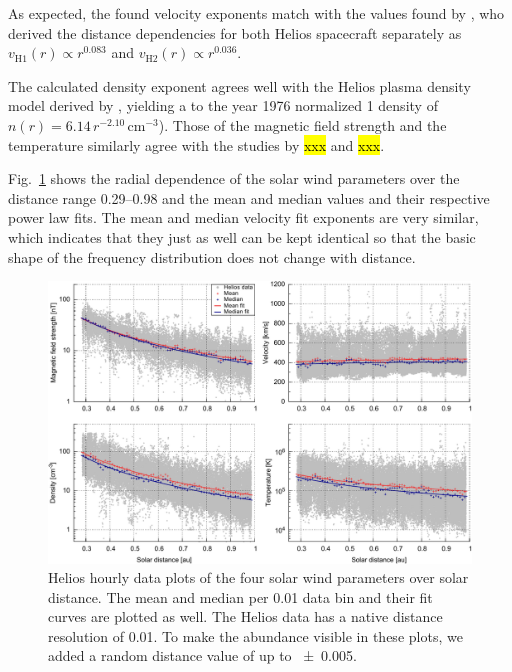 As expected, the found velocity exponents match with the values found by \citet{Schwenn1983,Schwenn1990}, who derived the distance dependencies for both Helios spacecraft separately as $v_\text{H1}(r) \propto r^{0.083}$ and $v_\text{H2}(r) \propto r^{0.036}$.

The calculated density exponent agrees well with the Helios plasma density model derived by \citet{Bougeret1984}, yielding a to the year 1976 normalized  \SI{1}{\au} density of $n(r) = 6.14\,r^{-2.10}\,\text{cm}^{-3}$). {\color{red} Those of the magnetic field strength and the temperature similarly agree with the studies by \hl{xxx} and \hl{xxx}}.

Fig.~\ref{fig:radial_fit_4_thesis_light_skip_pdfcairo_plot} shows the radial dependence of the solar wind parameters over the distance range \SIrange{0.29}{0.98}{\au} and the mean and median values and their respective power law fits. The mean and median velocity fit exponents are very similar, which indicates that they just as well can be kept identical so that the basic shape of the frequency distribution does not change with distance.
\begin{figure}
	\includegraphics[width=18cm]{figures/radial_fit_4_thesis_light_skip_pdfcairo_plot.pdf}
	\caption{Helios hourly data plots of the four solar wind parameters over solar distance. The mean and median per \SI{0.01}{\au} data bin and their fit curves are plotted as well. The Helios data has a native distance resolution of \SI{0.01}{\au}. To make the abundance visible in these plots, we added a random distance value of up to \SI{+-0.005}{\au}.}
	\label{fig:radial_fit_4_thesis_light_skip_pdfcairo_plot}
\end{figure}

